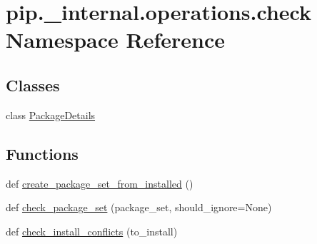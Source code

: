 \hypertarget{namespacepip_1_1__internal_1_1operations_1_1check}{}\section{pip.\+\_\+internal.\+operations.\+check Namespace Reference}
\label{namespacepip_1_1__internal_1_1operations_1_1check}
\subsection*{Classes}
\begin{DoxyCompactItemize}
\item 
class \hyperlink{classpip_1_1__internal_1_1operations_1_1check_1_1PackageDetails}{Package\+Details}
\end{DoxyCompactItemize}
\subsection*{Functions}
\begin{DoxyCompactItemize}
\item 
def \hyperlink{namespacepip_1_1__internal_1_1operations_1_1check_a16f9450b88a86043db9fc201080a6315}{create\+\_\+package\+\_\+set\+\_\+from\+\_\+installed} ()
\item 
def \hyperlink{namespacepip_1_1__internal_1_1operations_1_1check_a1ae204e94552bedc2f09993016f77e4e}{check\+\_\+package\+\_\+set} (package\+\_\+set, should\+\_\+ignore=None)
\item 
def \hyperlink{namespacepip_1_1__internal_1_1operations_1_1check_a872c01627dab38f37f73bcbf182260f2}{check\+\_\+install\+\_\+conflicts} (to\+\_\+install)
\end{DoxyCompactItemize}
